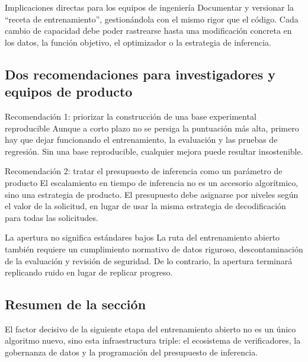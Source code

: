 \documentclass[a4paper]{article}
\begin{document}
\begin{knowledgebox}{Implicaciones directas para los equipos de ingeniería}
Documentar y versionar la ``receta de entrenamiento'', gestionándola con el mismo rigor que el código. Cada cambio de capacidad debe poder rastrearse hasta una modificación concreta en los datos, la función objetivo, el optimizador o la estrategia de inferencia.
\end{knowledgebox}

\subsection{Dos recomendaciones para investigadores y equipos de producto}
\begin{importantbox}{Recomendación 1: priorizar la construcción de una base experimental reproducible}
Aunque a corto plazo no se persiga la puntuación más alta, primero hay que dejar funcionando el entrenamiento, la evaluación y las pruebas de regresión. Sin una base reproducible, cualquier mejora puede resultar insostenible.
\end{importantbox}

\begin{importantbox}{Recomendación 2: tratar el presupuesto de inferencia como un parámetro de producto}
El escalamiento en tiempo de inferencia no es un accesorio algorítmico, sino una estrategia de producto. El presupuesto debe asignarse por niveles según el valor de la solicitud, en lugar de usar la misma estrategia de decodificación para todas las solicitudes.
\end{importantbox}

\begin{warningbox}{La apertura no significa estándares bajos}
La ruta del entrenamiento abierto también requiere un cumplimiento normativo de datos riguroso, descontaminación de la evaluación y revisión de seguridad. De lo contrario, la apertura terminará replicando ruido en lugar de replicar progreso.
\end{warningbox}

\subsection{Resumen de la sección}
El factor decisivo de la siguiente etapa del entrenamiento abierto no es un único algoritmo nuevo, sino esta infraestructura triple: el ecosistema de verificadores, la gobernanza de datos y la programación del presupuesto de inferencia.
\end{document}
